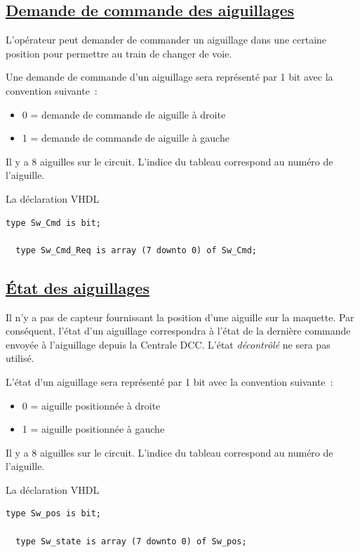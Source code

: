 \subsection{\underline{Demande de commande des aiguillages}}
\label{sec:ixl_dem_aig}

L'opérateur peut demander de commander un aiguillage dans une certaine
position pour permettre au train de changer de voie.

Une demande de commande d'un aiguillage sera représenté par
1 bit avec la convention suivante~:
\begin{itemize}
\item 0 = demande de commande de aiguille à droite
\item 1 = demande de commande de aiguille à gauche
\end{itemize}
 
Il y a 8 aiguilles sur le circuit. L'indice du tableau correspond au
numéro de l'aiguille.

\medskip
La déclaration VHDL
\begin{lstlisting}[style=vhdl]
  type Sw_Cmd is bit;
  
  type Sw_Cmd_Req is array (7 downto 0) of Sw_Cmd;
\end{lstlisting}


\subsection{\underline{\'Etat des aiguillages}}
\label{sec:ixl_aig}

Il n'y a pas de capteur fournissant la position d'une aiguille sur la
maquette.  Par conséquent, l'état d'un aiguillage correspondra à l'état
de la dernière commande envoyée à l'aiguillage depuis la Centrale DCC.
L'état \emph{décontrôlé} ne sera pas utilisé.
 
L'état d'un aiguillage sera représenté par 1 bit avec la convention
suivante~:
\begin{itemize}
\item 0 = aiguille positionnée à droite
\item 1 = aiguille positionnée à gauche
\end{itemize}
 
Il y a 8 aiguilles sur le circuit. L'indice du tableau correspond au
numéro de l'aiguille.

\medskip
La déclaration VHDL
\begin{lstlisting}[style=vhdl]
  type Sw_pos is bit;
  
  type Sw_state is array (7 downto 0) of Sw_pos;
\end{lstlisting}


